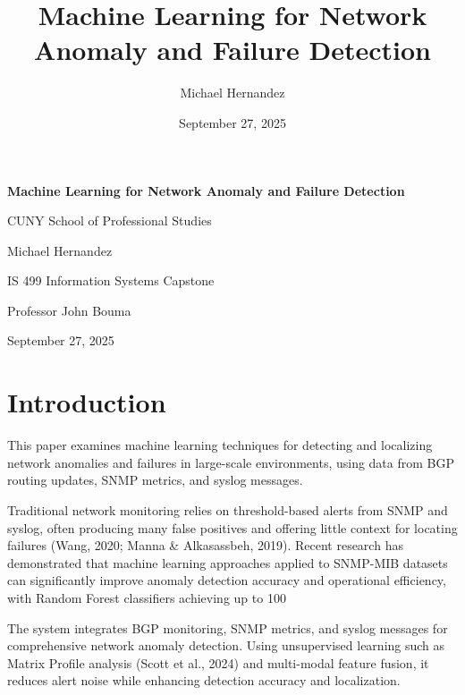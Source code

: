 \documentclass[11pt]{article}
\title{Machine Learning for Network Anomaly and Failure Detection}
\author{Michael Hernandez}
\date{September 27, 2025}
\begin{document}
\begin{titlepage}
\centering
\vspace*{2cm}

{\Large \textbf{Machine Learning for Network Anomaly and Failure Detection}}

\vspace{1.5cm}

{\large CUNY School of Professional Studies}

\vspace{0.5cm}

{\large Michael Hernandez}

\vspace{0.5cm}

{\large IS 499 Information Systems Capstone}

\vspace{0.5cm}

{\large Professor John Bouma}

\vspace{0.5cm}

{\large September 27, 2025}

\vfill

\end{titlepage}

\tableofcontents
\newpage

\section{Introduction}

This paper examines machine learning techniques for detecting and localizing network anomalies and failures in large-scale environments, using data from BGP routing updates, SNMP metrics, and syslog messages.

Traditional network monitoring relies on threshold-based alerts from SNMP and syslog, often producing many false positives and offering little context for locating failures (Wang, 2020; Manna \& Alkasassbeh, 2019). Recent research has demonstrated that machine learning approaches applied to SNMP-MIB datasets can significantly improve anomaly detection accuracy and operational efficiency, with Random Forest classifiers achieving up to 100%

The system integrates BGP monitoring, SNMP metrics, and syslog messages for comprehensive network anomaly detection. Using unsupervised learning such as Matrix Profile analysis (Scott et al., 2024) and multi-modal feature fusion, it reduces alert noise while enhancing detection accuracy and localization.
\end{document}
